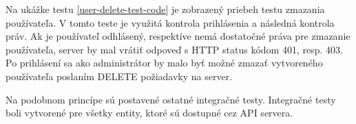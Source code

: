 Na ukážke testu \ref{user-delete-test-code} je zobrazený priebeh testu zmazania používateľa. V tomto teste je využitá kontrola prihlásenia a následná kontrola práv. Ak je používateľ odhlásený, respektíve nemá dostatočné práva pre zmazanie používateľa, server by mal vrátiť odpoveď s HTTP status kódom 401, resp. 403. Po prihlásení sa ako administrátor by malo byť možné zmazať vytvoreného používateľa poslaním DELETE požiadavky na server.

Na podobnom princípe sú postavené ostatné integračné testy. Integračné testy boli vytvorené pre všetky entity, ktoré sú dostupné cez API servera.





